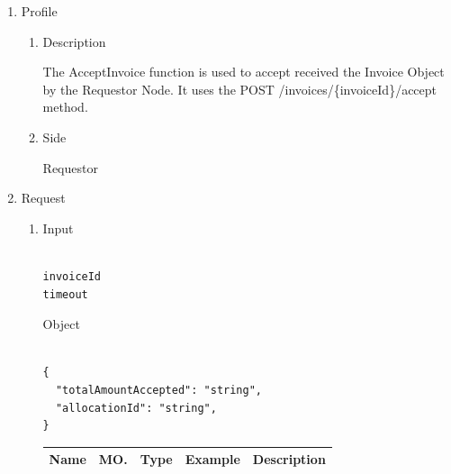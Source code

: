 \newpage




\begin{enumerate}

\item Profile

\begin{enumerate}

\item Description

The AcceptInvoice function is used to accept received the Invoice Object by the Requestor Node. 
It uses the POST /invoices/\{invoiceId\}/accept method.

\item Side

Requestor

\end{enumerate}

\item Request

\begin{enumerate}

\item Input

\begin{tcolorbox}[boxrule=0pt, frame empty]
\begin{verbatim}

invoiceId
timeout

\end{verbatim}
\end{tcolorbox}

Object

\begin{tcolorbox}[boxrule=0pt, frame empty]
\begin{verbatim}

{
  "totalAmountAccepted": "string",
  "allocationId": "string",
}

\end{verbatim}
\end{tcolorbox}

\begin{table}[H]
\footnotesize

\begin{center}
\begin{tabular}{|p{3cm}|l|p{3cm}|p{3cm}|p{4cm}|} 
\hline
\rowcolor{lightgray}	Name	& MO.	& Type	& Example & 	Description \\
\hline


\end{tabular}
\end{center}
\end{table}
\end{enumerate}
\end{enumerate}
